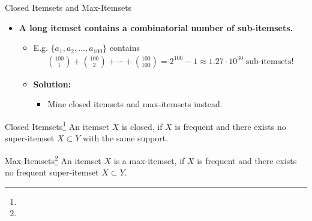 \begin{frame}{Closed Itemsets and Max-Itemsets}
	\begin{itemize}
		\item \textbf{A long itemset contains a combinatorial number of
			      sub-itemsets.}
		      \begin{itemize}
			      \item E.g. $\{a_1,a_2,\ldots,a_{100}\}$ contains
			            \begin{align*}
				            {100\choose 1} + {100 \choose 2} + \cdots + {100 \choose 100} =
				            2^{100}-1 \approx 1.27 \cdot 10^{30} \; \text{sub-itemsets!}
			            \end{align*}
			      \item \textbf{Solution:}
			            \begin{itemize}
				            \item Mine closed itemsets and max-itemsets instead.
			            \end{itemize}
		      \end{itemize}
	\end{itemize}

	\begin{block}{Closed Itemsets\footnote{}}
		An itemset $X$ is closed, if $X$ is frequent and there exists no super-itemset $X \subset Y$ with the same support.
	\end{block}

	\begin{block}{Max-Itemsets\footnote{}}
		An itemset $X$ is a max-itemset, if $X$ is frequent and there exists no frequent super-itemset $X \subset Y$.
	\end{block}

	\vspace{0.25cm}
\end{frame}


